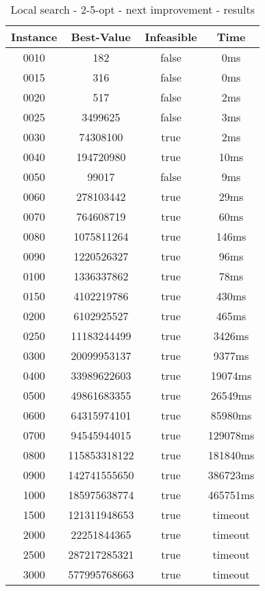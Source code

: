 \begin{table}[H]
	\centering
	\begin{tabular}{|| c | c | c | c ||} 
		\hline
		Instance & Best-Value & Infeasible & Time \\
		\hline\hline
		0010 & 182 & false & 0ms \\
		0015 & 316 & false & 0ms \\
		0020 & 517 & false & 2ms \\
		0025 & 3499625 & false & 3ms \\
		0030 & 74308100 & true & 2ms \\
		0040 & 194720980 & true & 10ms \\
		0050 & 99017 & false & 9ms \\
		0060 & 278103442 & true & 29ms \\
		0070 & 764608719 & true & 60ms \\
		0080 & 1075811264 & true & 146ms \\
		0090 & 1220526327 & true & 96ms \\
		0100 & 1336337862 & true & 78ms \\
		0150 & 4102219786 & true & 430ms \\
		0200 & 6102925527 & true & 465ms \\
		0250 & 11183244499 & true & 3426ms \\
		0300 & 20099953137 & true & 9377ms \\
		0400 & 33989622603 & true & 19074ms \\
		0500 & 49861683355 & true & 26549ms \\
		0600 & 64315974101 & true & 85980ms \\
		0700 & 94545944015 & true & 129078ms \\
		0800 & 115853318122 & true & 181840ms \\
		0900 & 142741555650 & true & 386723ms \\
		1000 & 185975638774 & true & 465751ms \\
		1500 & 121311948653 & true & timeout \\
		2000 & 22251844365 & true & timeout \\
		2500 & 287217285321 & true & timeout \\
		3000 & 577995768663 & true & timeout \\
		\hline
	\end{tabular}
	\caption{Local search - 2-5-opt - next improvement - results}
\end{table}

